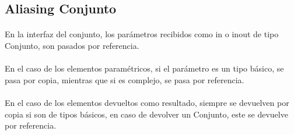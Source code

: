 \subsection*{Aliasing Conjunto}

\paragraph{}
En la interfaz del conjunto, los par\'ametros recibidos como in o inout de tipo Conjunto, son pasados por referencia.

\paragraph{}
En el caso de los elementos param\'etricos, si el par\'ametro es un tipo b\'asico, se pasa por copia, mientras que si es complejo, se pasa por referencia.

\paragraph{}
En el caso de los elementos devueltos como resultado, siempre se devuelven por copia si son de tipos b\'asicos, en caso de devolver un Conjunto, este se devuelve por referencia.
